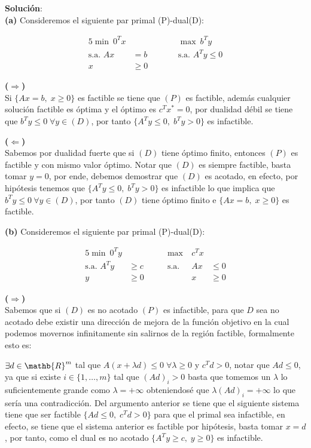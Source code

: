 \documentclass[10pt]{article}
\theoremstyle{plain}
\theoremstyle{definition}
\begin{document}
\textbf{Solución}:\\

\textbf{(a)}
Consideremos el siguiente par primal (P)-dual(D):

\begin{center}
\begin{alignat*}{5}
\min\  0^{T}x &\qquad&&\max\ b^{T}y \\
\text{s.a. }  Ax&= b \qquad&& \text{s.a. }  A^{T}y\leq 0 \\
x&\geq 0  \qquad&&
\end{alignat*}
\end{center}

\textbf{($\Longrightarrow$)}\\
Si $\{Ax=b, \; x\geq0\}$ es factible se tiene que $(P)$ es factible, además cualquier solución factible es óptima y el óptimo es $c^{T}x^{*}=0$, por dualidad débil se tiene que $b^{T}y\leq0 \;\forall y \in (D)$, por tanto $\{A^{T}y\leq0, \; b^{T}y>0\}$ es infactible.

\textbf{($\Longleftarrow$)}\\
Sabemos por dualidad fuerte que si $(D)$ tiene óptimo finito, entonces $(P)$ es factible y con mismo valor óptimo. Notar que $(D)$ es siempre factible, basta tomar $y=0$, por ende, debemos demostrar que $(D)$ es acotado, en efecto, por hipótesis tenemos que $\{A^{T}y\leq0, \; b^{T}y>0\}$ es infactible lo que implica que  $b^{T}y\leq0\ \forall y \in (D)$, por tanto $(D)$ tiene óptimo finito e $\{Ax=b, \; x\geq0\}$ es factible.

\textbf{(b)}
Consideremos el siguiente par primal (P)-dual(D):

\begin{center}
\begin{alignat*}{5}
\min\  0^{T}y &\qquad&\max\ &c^{T}x \\
\text{s.a. }  A^{T}y&\geq c \qquad& \text{s.a. }  &Ax&\leq 0 \\
y&\geq 0  \qquad& &x&\geq 0
\end{alignat*}
\end{center}

\textbf{($\Longrightarrow$)}\\
Sabemos que si $(D)$ es no acotado $(P)$ es infactible, para que $D$ sea no acotado debe existir una dirección de mejora de la función objetivo en la cual podemos movernos infinitamente sin salirnos de la región factible, formalmente esto es:

$\exists d\in\mathb{R}^{m}$ tal que $A(x+\lambda d)\leq0 \; \forall \lambda\geq0$ y $c^{T}d > 0$, notar que $Ad\leq0$, ya que si existe $i \in \{1, \ldots, m\}$ tal que $(Ad)_{i}>0$ basta que tomemos un $\lambda$ lo suficientemente grande como $\lambda=+\infty$ obteniendosé que $\lambda(Ad)_{i}=+\infty$ lo que sería una contradicción. Del argumento anterior se tiene que el siguiente sistema tiene que ser factible $\{Ad\leq0, \;c^{T}d > 0\}$ para que el primal sea infactible, en efecto, se tiene que el sistema anterior es factible por hipótesis, basta tomar $x=d$, por tanto, como el dual es no acotado  $\{A^{T}y\geq c, \; y\geq0\}$ es infactible.
\end{document}
